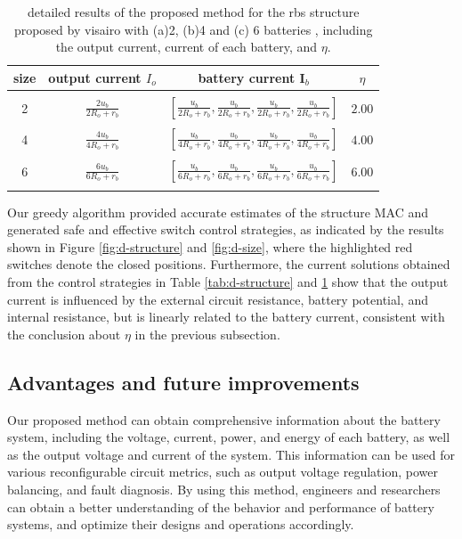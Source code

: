 \documentclass{article}
\begin{document}
\begin{table}[h]
    \caption{detailed results of the proposed method for the rbs structure  proposed by visairo\cite{visairoReconfigurableBatteryPack2008} with (a)2, (b)4 and (c) 6 batteries , including the output current, current of each battery, and $\eta$.}
    \label{tab:d-size}
    \begin{tabular}{cccc}
        \hline
        size &  output current $I_o$       & battery current $\bm{I}_b$       & $\eta$        \\
        \hline\\
        2 &  $\displaystyle\frac{2u_b}{2R_o + r_b}$ &  $\displaystyle\left[\frac{u_b}{2R_o + r_b},\frac{u_b}{2R_o + r_b},\frac{u_b}{2R_o + r_b},\frac{u_b}{2R_o + r_b}\right]$   & $2.00$ \\
        \\
        4 &  $\displaystyle\frac{4u_b}{4R_o + r_b}$ &  $\displaystyle\left[\frac{u_b}{4R_o + r_b},\frac{u_b}{4R_o + r_b},\frac{u_b}{4R_o + r_b},\frac{u_b}{4R_o + r_b}\right]$   & $4.00$ \\
        \\
        6 &  $\displaystyle\frac{6u_b}{6R_o + r_b}$ &  $\displaystyle\left[\frac{u_b}{6R_o + r_b},\frac{u_b}{6R_o + r_b},\frac{u_b}{6R_o + r_b},\frac{u_b}{6R_o + r_b}\right]$   & $6.00$ \\
        \\
        \hline
    \end{tabular}
\end{table}

Our greedy algorithm provided accurate estimates of the structure MAC and generated safe and effective switch control strategies, as indicated by the results shown in Figure \ref{fig:d-structure} and \ref{fig:d-size}, where the highlighted red switches denote the closed positions.
Furthermore, the current solutions obtained from the control strategies in Table \ref{tab:d-structure} and \ref{tab:d-size} show that the output current is influenced by the external circuit resistance, battery potential, and internal resistance, but is linearly related to the battery current, consistent with the conclusion about $\eta$ in the previous subsection.

\subsection{Advantages and future improvements}

Our proposed method can obtain comprehensive information about the battery system, including the voltage, current, power, and energy of each battery, as well as the output voltage and current of the system.
This information can be used for various reconfigurable circuit metrics, such as output voltage regulation, power balancing, and fault diagnosis.
By using this method, engineers and researchers can obtain a better understanding of the behavior and performance of battery systems, and optimize their designs and operations accordingly.
\end{document}
